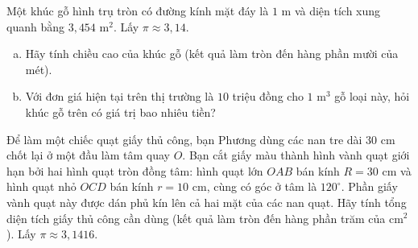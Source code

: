 \begin{bt}%
Một khúc gỗ hình trụ tròn có đường kính mặt đáy là $1\text{ m}$ và diện tích xung quanh bằng $3{,}454\text{ m}^2$. Lấy $\pi \approx 3{,}14$.
\begin{enumerate}[a)]
    \item Hãy tính chiều cao của khúc gỗ (kết quả làm tròn đến hàng phần mười của mét).
    \item Với đơn giá hiện tại trên thị trường là $10$ triệu đồng cho $1\text{ m}^3$ gỗ loại này, hỏi khúc gỗ trên có giá trị bao nhiêu tiền?
\end{enumerate}
\end{bt}

\begin{bt}%
Để làm một chiếc quạt giấy thủ công, bạn Phương dùng các nan tre dài $30\text{ cm}$ chốt lại ở một đầu làm tâm quay $O$. Bạn cắt giấy màu thành hình vành quạt giới hạn bởi hai hình quạt tròn đồng tâm: hình quạt lớn $OAB$ bán kính $R = 30\text{ cm}$ và hình quạt nhỏ $OCD$ bán kính $r = 10\text{ cm}$, cùng có góc ở tâm là $120^\circ$. Phần giấy vành quạt này được dán phủ kín lên cả hai mặt của các nan quạt. Hãy tính tổng diện tích giấy thủ công cần dùng (kết quả làm tròn đến hàng phần trăm của $\text{cm}^2$). Lấy $\pi \approx 3{,}1416$.
\end{bt}

